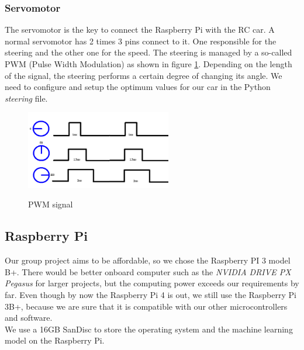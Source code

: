 \documentclass[journal]{IEEEtran}
\begin{document}
\subsubsection{Servomotor}

The servomotor is the key to connect the Raspberry Pi with the RC car. A normal servomotor has 2 times 3 pins connect to it. One responsible for the steering and the other one for the speed. The steering is managed by a so-called PWM (Pulse Width Modulation) as shown in figure \ref{pwm}. Depending on the length of the signal, the steering performs a certain degree of changing its angle. We need to configure and setup the optimum values for our car in the Python \textit{steering} file. \\

\begin{figure}
  \begin{center}
  \includegraphics[width=2.5in]{photo/pwm}\\
  \caption{PWM signal}\label{pwm}
  \end{center}
\end{figure}

\subsection{Raspberry Pi}
Our group project aims to be affordable, so we chose the Raspberry PI 3 model B+. There would be better onboard computer such as the \textit{NVIDIA DRIVE PX Pegasus} for larger projects, but the computing power exceeds our requirements by far.
Even though by now the Raspberry Pi 4 is out, we still use the Raspberry Pi 3B+, because we are sure that it is compatible with our other microcontrollers and software. \\
We use a 16GB SanDisc to store the operating system and the machine learning model on the Raspberry Pi. \\
\end{document}
